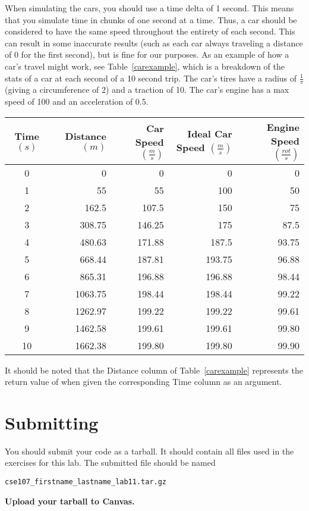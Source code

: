 \documentclass[11pt]{cselabheader}
\begin{document}
\begin{ex}
  
  When simulating the cars, you should use a time delta of 1 second. This means
  that you simulate time in chunks of one second at a time. Thus, a car should
  be considered to have the same speed throughout the entirety of each second.
  This can result in some inaccurate results (such as each car always
  traveling a distance of 0 for the first second), but is fine for our
  purposes. As an example of how a car's travel might work, see
  Table~\ref{carexample}, which is a breakdown of the stats of a car at each
  second of a 10 second trip. The car's tires have a radius of $\frac{1}{\pi}$
  (giving a circumference of 2) and a traction of 10. The car's engine has a
  max speed of 100 and an acceleration of 0.5.
  
  \begin{center}
    \begin{tabular}{crrrr}
    \toprule
    Time $(s)$ & Distance $(m)$ & Car Speed $(\frac{m}{s})$ &
    Ideal Car Speed $(\frac{m}{s})$ & Engine Speed $(\frac{rot}{s})$\\
    \midrule
    0 & 0 & 0 & 0 & 0\\
    1 & 55 & 55 & 100 & 50\\
    2 & 162.5 & 107.5 & 150 & 75\\
    3 & 308.75 & 146.25 & 175 & 87.5\\
    4 & 480.63 & 171.88 & 187.5 & 93.75\\
    5 & 668.44 & 187.81 & 193.75 & 96.88\\
    6 & 865.31 & 196.88 & 196.88 & 98.44\\
    7 & 1063.75 & 198.44 & 198.44 & 99.22\\
    8 & 1262.97 & 199.22 & 199.22 & 99.61\\
    9 & 1462.58 & 199.61 & 199.61 & 99.80\\
    10 & 1662.38 & 199.80 & 199.80 & 99.90\\
    \bottomrule
    \end{tabular}
    \label{carexample}
  \end{center}
  
  It should be noted that the Distance column of Table~\ref{carexample}
  represents the return value of  when given the
  corresponding Time column as an argument.
\end{ex}

\pagebreak
\section{Submitting}
You should submit your code as a tarball. It should contain all files
used in the exercises for this lab. The submitted file should be named
\begin{center}
  \texttt{cse107\_firstname\_lastname\_lab11.tar.gz}
\end{center}

\begin{center}
  \textbf{Upload your tarball to Canvas.}
\end{center}

\listoftheorems
\end{document}
